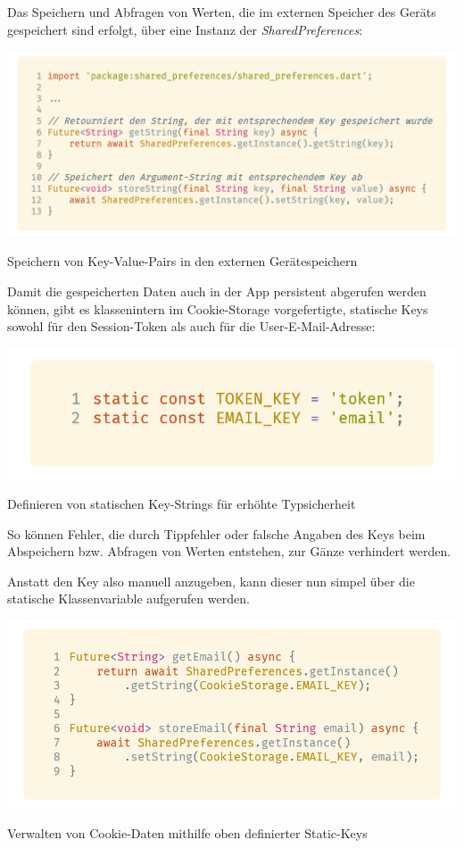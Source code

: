 Das Speichern und Abfragen von Werten, die im externen Speicher des Geräts gespeichert sind erfolgt, über eine Instanz der \textit{SharedPreferences}:

\begin{code}[H]
    \centering
    \includegraphics[width=1\textwidth]{images/Client/util/cookie-storage/sharedPreferences.png}
    \vspace{-25pt}
    \caption{Speichern von Key-Value-Pairs in den externen Gerätespeichern}
\end{code}

Damit die gespeicherten Daten auch in der App persistent abgerufen werden können, gibt es klassenintern
im Cookie-Storage vorgefertigte, statische Keys sowohl für den Session-Token als auch für die User-E-Mail-Adresse:

\begin{code}
    \centering
    \includegraphics[width=1\textwidth]{images/Client/util/cookie-storage/cookieKeys.png}
    \vspace{-25pt}
    \caption{Definieren von statischen Key-Strings für erhöhte Typsicherheit}
\end{code}

So können Fehler, die durch Tippfehler oder falsche Angaben des Keys beim Abspeichern bzw. Abfragen
von Werten entstehen, zur Gänze verhindert werden.

Anstatt den Key also manuell anzugeben, kann dieser nun simpel über die statische Klassenvariable
aufgerufen werden.

\begin{code}
    \centering
    \includegraphics[width=1\textwidth]{images/Client/util/cookie-storage/getAndStoreWithStaticKey.png}
    \vspace{-25pt}
    \caption{Verwalten von Cookie-Daten mithilfe oben definierter Static-Keys}
\end{code}